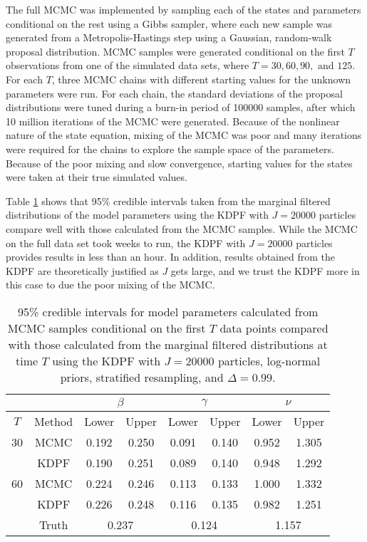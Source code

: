 \documentclass{elsarticle}
\begin{document}
The full MCMC was implemented by sampling each of the states and parameters conditional on the rest using a Gibbs sampler, where each new sample was generated from a Metropolis-Hastings step using a Gaussian, random-walk proposal distribution. MCMC samples were generated conditional on the first $T$ observations from one of the simulated data sets, where $T = 30, 60, 90, \mbox{ and } 125$. For each $T$, three MCMC chains with different starting values for the unknown parameters were run. For each chain, the standard deviations of the proposal distributions were tuned during a burn-in period of 100000 samples, after which 10 million iterations of the MCMC were generated. Because of the nonlinear nature of the state equation, mixing of the MCMC was poor and many iterations were required for the chains to explore the sample space of the parameters. Because of the poor mixing and slow convergence, starting values for the states were taken at their true simulated values.

Table \ref{tab:mcmc} shows that 95\% credible intervals taken from the marginal filtered distributions of the model parameters using the KDPF with $J = 20000$ particles compare well with those calculated from the MCMC samples. While the MCMC on the full data set took weeks to run, the KDPF with $J = 20000$ particles provides results in less than an hour. In addition, results obtained from the KDPF are theoretically justified as $J$ gets large, and we trust the KDPF more in this case to due the poor mixing of the MCMC.

\begin{table}[hb]
\begin{center}
\begin{tabular}{|c|c|cc|cc|cc|}
\hline
 & & \multicolumn{2}{|c|}{$\beta$} & \multicolumn{2}{|c|}{$\gamma$} & \multicolumn{2}{|c|}{$\nu$} \\
\hline
$T$ & Method & Lower & Upper & Lower & Upper & Lower & Upper \\
\hline
30 & MCMC & 0.192 & 0.250 & 0.091 & 0.140 & 0.952 & 1.305 \\
   & KDPF & 0.190 & 0.251 & 0.089 & 0.140 & 0.948 & 1.292 \\
\hline
60 & MCMC & 0.224 & 0.246 & 0.113 & 0.133 & 1.000 & 1.332 \\
   & KDPF & 0.226 & 0.248 & 0.116 & 0.135 & 0.982 & 1.251 \\
\hline
 & Truth & \multicolumn{2}{|c|}{0.237} & \multicolumn{2}{|c|}{0.124} & \multicolumn{2}{|c|}{1.157} \\
\hline
\end{tabular}
\caption{95\% credible intervals for model parameters calculated from MCMC samples conditional on the first $T$ data points compared with those calculated from the marginal filtered distributions at time $T$ using the KDPF with $J = 20000$ particles, log-normal priors, stratified resampling, and $\Delta = 0.99$.}
\label{tab:mcmc}
\end{center}
\end{table}
\end{document}
